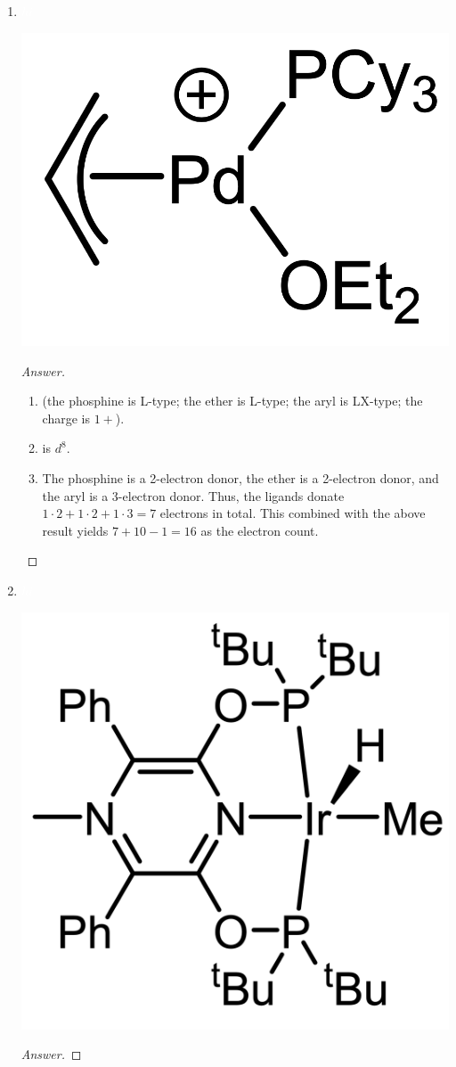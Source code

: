 \documentclass[../psets.tex]{subfiles}
\begin{document}
\begin{enumerate}
\begin{enumerate}[label={\arabic*)}]
\begin{proof}[Answer]
\begin{enumerate}[label={(\roman*)}]
                \item {} is $d^6$.
                \item The chlorine is a 1-electron donor, and the tris(phosphino)borate group is a 5-electron donor (3 dative bonds minus a single negative formal charge on the boron). Thus, the ligands donate $1\cdot 1+1\cdot 5=6$ electrons in total. This combined with the above results yields $6+8=14$ as the electron count.
            \end{enumerate}
        \end{proof}
        \newpage
        \item ${\color{white}hi}$
        \begin{center}
            \includegraphics[width=0.18\linewidth]{../ExtFiles/pset1-1-16.png}
        \end{center}
        \begin{proof}[Answer]\leavevmode
            \begin{enumerate}[label={(\roman*)}]
                \item {} (the phosphine is L-type; the ether is L-type; the aryl is LX-type; the charge is $1+$).
                \item {} is $d^8$.
                \item The phosphine is a 2-electron donor, the ether is a 2-electron donor, and the aryl is a 3-electron donor. Thus, the ligands donate $1\cdot 2+1\cdot 2+1\cdot 3=7$ electrons in total. This combined with the above result yields $7+10-1=16$ as the electron count.
            \end{enumerate}
        \end{proof}
        \item ${\color{white}hi}$
        \begin{center}
            \includegraphics[width=0.24\linewidth]{../ExtFiles/pset1-1-17.png}
        \end{center}
        \begin{proof}[Answer]\leavevmode

\end{proof}
\end{enumerate}
\end{enumerate}
\end{document}
